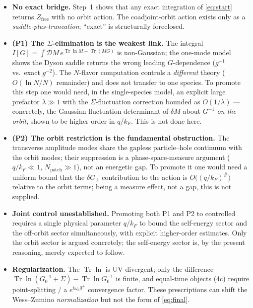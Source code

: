 \documentclass[11pt]{article}
\theoremstyle{remark}
\begin{document}
\begin{itemize}
\item \textbf{No exact bridge.} Step~1 shows that any exact integration of \eqref{eq:start}
returns $Z_{\mathrm{free}}$ with no orbit action. The coadjoint-orbit action exists only as
a \emph{saddle-plus-truncation}; ``exact'' is structurally foreclosed.

\item \textbf{(P1) The $\Sigma$-elimination is the weakest link.} The integral
$I[G]=\int\mathcal{D}M\,e^{\operatorname{Tr}\ln M-\operatorname{Tr}(MG)}$ is non-Gaussian; the
one-mode model shows the Dyson saddle returns the wrong leading $G$-dependence
($g^{-1}$ vs.\ exact $g^{-2}$). The $N$-flavor computation controls a \emph{different}
theory ($O(\ln N/N)$ remainder) and does not transfer to one species. To promote this step
one would need, in the single-species model, an explicit large prefactor $\lambda\gg1$ with
the $\Sigma$-fluctuation correction bounded as $O(1/\lambda)$ --- concretely, the Gaussian
fluctuation determinant of $\delta M$ about $G^{-1}$ \emph{on the orbit}, shown to be higher
order in $q/k_F$. This is not done here.

\item \textbf{(P2) The orbit restriction is the fundamental obstruction.} The transverse
amplitude modes share the gapless particle--hole continuum with the orbit modes; their
suppression is a phase-space-measure argument ($q/k_F\ll1$, $N_{\mathrm{patch}}\gg1$), not
an energetic gap. To promote it one would need a uniform bound that the $\delta G_\perp$
contribution to the action is $O\!\big((q/k_F)^{\#}\big)$ relative to the orbit terms; being
a measure effect, not a gap, this is not supplied.

\item \textbf{Joint control unestablished.} Promoting both P1 and P2 to controlled requires
a single physical parameter $q/k_F$ to bound the self-energy sector and the off-orbit sector
simultaneously, with explicit higher-order estimates. Only the orbit sector is argued
concretely; the self-energy sector is, by the present reasoning, merely expected to follow.

\item \textbf{Regularization.} The $\operatorname{Tr}\ln$ is UV-divergent; only the difference
$\operatorname{Tr}\ln(G_0^{-1}+\Sigma)-\operatorname{Tr}\ln G_0^{-1}$ is finite, and equal-time
objects (4c) require point-splitting / a $e^{i\omega_n 0^+}$ convergence factor. These
prescriptions can shift the Wess--Zumino \emph{normalization} but not the form of
\eqref{eq:final}.


\end{itemize}
\end{document}
